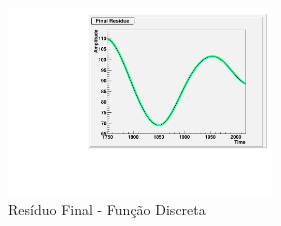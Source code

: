 \documentclass[letterpaper]{article}
\begin{document}
\begin{multicols}{2}
\begin{center}
\begin{figure}[H]
\centering
    \includegraphics[width=7cm]{Residue_Sun.pdf}
    \caption{Resíduo Final - Função Discreta}
\end{figure}
\end{center}

\end{multicols}
\end{document}
